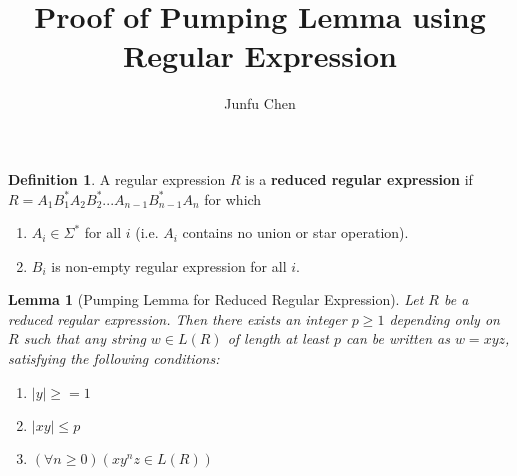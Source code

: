 \documentclass[11pt]{article}
\newtheorem*{lemma}{Lemma}
\theoremstyle{definition}
\newtheorem*{definition}{Definition}
\begin{document}
\author{Junfu Chen}
\title{Proof of Pumping Lemma using Regular Expression}
\maketitle

\medskip
\begin{definition}
A regular expression $R$ is a \textbf{reduced regular expression} if $R = A_1B_1^*A_2B_2^*...A_{n-1}B_{n-1}^*A_n$ for which
\begin{enumerate}
    \item $A_i \in \Sigma^*$ for all $i$ (i.e. $A_i$ contains no union or star operation).
    \item $B_i$ is non-empty regular expression for all $i$.
\end{enumerate}
\end{definition}
\begin{lemma}[Pumping Lemma for Reduced Regular Expression] Let $R$ be a reduced regular expression. Then there exists an integer $p\geq 1$ depending only on $R$ such that any string $w \in L(R)$ of length at least $p$ can be written as $w = xyz$, satisfying the following conditions:
\begin{enumerate}
    \item $|y| \geq = 1$
    \item $|xy|\leq p$
    \item $(\forall n\geq 0)(xy^nz\in L(R))$
\end{enumerate}
\end{lemma}
\end{document}
